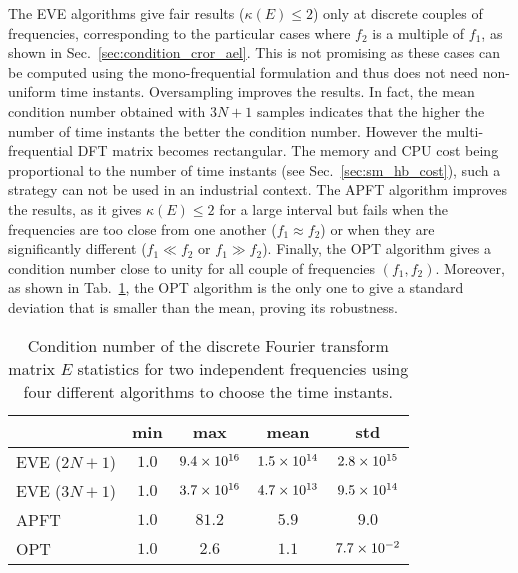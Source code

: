 The EVE algorithms give fair results ($\kappa(E) \leq 2$) only at
discrete couples of frequencies, corresponding 
to the particular cases where $f_2$ is a
multiple of $f_1$, as shown in Sec.~\ref{sec:condition_cror_ael}. 
This is not promising as these
cases can be computed using the mono-frequential formulation and thus does not
need non-uniform time instants. Oversampling improves the results. 
In fact, the mean condition number obtained
with $3N + 1$ samples indicates that the higher the number of time instants
the better the condition number. However the multi-frequential DFT
matrix becomes rectangular. The memory and CPU cost being proportional to 
the number of time instants (see Sec.~\ref{sec:sm_hb_cost}), 
such a strategy can not be
used in an industrial context. The APFT
algorithm improves the results, as it gives $\kappa (E) \leq 2$ 
for a large interval but fails when the frequencies
are too close from one another ($f_1 \approx f_2$) or when they are significantly
different ($f_1 \ll f_2$ or $f_1 \gg f_2$).  
Finally, the OPT algorithm gives a condition number close to unity for
all couple of frequencies $(f_1, f_2)$. Moreover, 
as shown in Tab.~\ref{tab:algo_sum}, the OPT algorithm is
the only one to give a standard deviation that is smaller than the mean,
proving its robustness.
\begin{table}[htp]
  \centering
  \begin{tabular}{lcccc}
    \toprule
    \phantom{abdefghijk} & min & max & mean & std \\
    \midrule
    EVE ($2N + 1$) & $1.0$ & $9.4\times 10^{16}$ & $1.5\times 10^{14}$ & $2.8\times 10^{15}$ \\
    EVE ($3N + 1$) & $1.0$ & $3.7\times 10^{16}$ & $4.7\times 10^{13}$ & $9.5\times 10^{14}$ \\
    APFT & $1.0$ & $81.2$ & $5.9$ & $9.0$ \\
    OPT & $1.0$ & $2.6$ & $1.1$ & $7.7\times 10^{-2}$ \\
    \bottomrule
  \end{tabular}
  \caption{Condition number of the discrete Fourier transform matrix $E$
  statistics for two independent frequencies using four different algorithms
  to choose the time instants.}
  \label{tab:algo_sum}
\end{table} 

